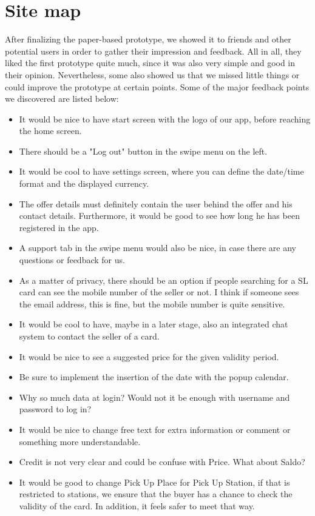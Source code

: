 \documentclass[11pt,twoside,a4paper]{report}
\begin{document}
\section{Site map}

After finalizing the paper-based prototype, we showed it to friends and other potential users in order to gather their impression and feedback. All in all, they liked the first prototype quite much, since it was also very simple and good in their opinion. Nevertheless, some also showed us that we missed little things or could improve the prototype at certain points. Some of the major feedback points we discovered are listed below:

\begin{itemize}
\item It would be nice to have start screen with the logo of our app, before reaching the home screen.
\item There should be a "Log out" button in the swipe menu on the left.
\item It would be cool to have settings screen, where you can define the date/time format and the displayed currency.
\item The offer details must definitely contain the user behind the offer and his contact details. Furthermore, it would be good to see how long he has been registered in the app.
\item A support tab in the swipe menu would also be nice, in case there are any questions or feedback for us.
\item As a matter of privacy, there should be an option if people searching for a SL card can see the mobile number of the seller or not. I think if someone sees the email address, this is fine, but the mobile number is quite sensitive.
\item It would be cool to have, maybe in a later stage, also an integrated chat system to contact the seller of a card.
\item It would be nice to see a suggested price for the given validity period.
\item Be sure to implement the insertion of the date with the popup calendar.
\item Why so much data at login? Would not it be enough with username and password to log in?
\item It would be nice to change free text for extra information or comment or something more understandable.
\item Credit is not very clear and could be confuse with Price. What about Saldo?
\item It would be good to change Pick Up Place for Pick Up Station, if that is restricted to stations, we ensure that the buyer has a chance to check the validity of the card. In addition, it feels safer to meet that way.
\end{itemize}
\end{document}
